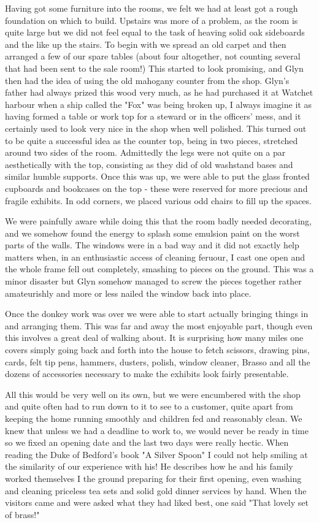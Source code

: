Having got some furniture into the rooms, we felt we had at least got a rough foundation on which to build. Upstairs was more of a problem, as the room is quite large but we did not feel equal to the task of heaving solid oak sideboards and the like up the stairs. To begin with we spread an old carpet and then arranged a few of our spare tables (about four altogether, not counting several that had been sent to the sale room!) This started to look promising, and Glyn then had the idea of using the old mahogany counter from the shop. Glyn's father had always prized this wood very much, as he had purchased it at Watchet harbour when a ship called the "Fox" was being broken up, I always imagine it as having formed a table or work top for a steward or in the officers' mess, and it certainly used to look very nice in the shop when well polished. This turned out to be quite a successful idea as the counter top, being in two pieces, stretched around two sides of the room. Admittedly the legs were not quite on a par aesthetically with the top, consisting as they did of old washstand bases and similar humble supports. Once this was up, we were able to put the glass fronted cupboards and bookcases on the top - these were reserved for more precious and fragile exhibits. In odd corners, we placed various odd chairs to fill up the spaces.

We were painfully aware while doing this that the room badly needed decorating, and we somehow found the energy to splash some emulsion paint on the worst parts of the walls. The windows were in a bad way and it did not exactly help matters when, in an enthusiastic access of cleaning feruour, I cast one open and the whole frame fell out completely, smashing to pieces on the ground. This was a minor disaster but Glyn somehow managed to screw the pieces together rather amateurishly and more or less nailed the window back into place.

Once the donkey work was over we were able to start actually bringing things in and arranging them. This was far and away the most enjoyable part, though even this involves a great deal of walking about. It is surprising how many miles one covers simply going back and forth into the house to fetch scissors, drawing pins, cards, felt tip pens, hammers, dusters, polish, window cleaner, Brasso and all the dozens of accessories necessary to make the exhibits look fairly presentable.

All this would be very well on its own, but we were encumbered with the shop and quite often had to run down to it to see to a customer, quite apart from keeping the home running smoothly and children fed and reasonably clean. We knew that unless we had a deadline to work to, we would never be ready in time so we fixed an opening date and the last two days were really hectic. When reading the Duke of Bedford's book "A Silver Spoon" I could not help smiling at the similarity of our experience with his! He describes how he and his family worked themselves I the ground preparing for their first opening, even washing and cleaning priceless tea sets and solid gold dinner services by hand. When the visitors came and were asked what they had liked best, one said "That lovely set of brass!"


